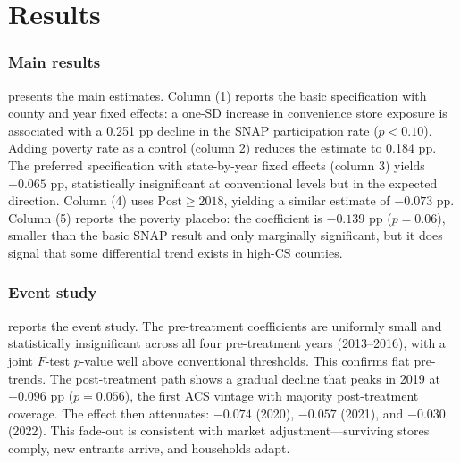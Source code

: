 \documentclass[12pt]{article}
\begin{document}
\section{Results}
\label{sec:results}

\subsubsection*{Main results}  presents the main estimates. Column (1) reports the basic specification with county and year fixed effects: a one-SD increase in convenience store exposure is associated with a 0.251 pp decline in the SNAP participation rate ($p < 0.10$). Adding poverty rate as a control (column 2) reduces the estimate to 0.184 pp. The preferred specification with state-by-year fixed effects (column 3) yields $-0.065$ pp, statistically insignificant at conventional levels but in the expected direction. Column (4) uses $\text{Post} \geq 2018$, yielding a similar estimate of $-0.073$ pp. Column (5) reports the poverty placebo: the coefficient is $-0.139$ pp ($p = 0.06$), smaller than the basic SNAP result and only marginally significant, but it does signal that some differential trend exists in high-CS counties.



\subsubsection*{Event study}  reports the event study. The pre-treatment coefficients are uniformly small and statistically insignificant across all four pre-treatment years (2013--2016), with a joint $F$-test $p$-value well above conventional thresholds. This confirms flat pre-trends. The post-treatment path shows a gradual decline that peaks in 2019 at $-0.096$ pp ($p = 0.056$), the first ACS vintage with majority post-treatment coverage. The effect then attenuates: $-0.074$ (2020), $-0.057$ (2021), and $-0.030$ (2022). This fade-out is consistent with market adjustment---surviving stores comply, new entrants arrive, and households adapt.


\end{document}
